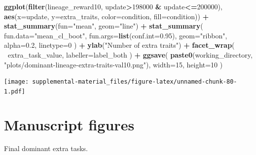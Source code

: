 \documentclass[]{book}
\newenvironment{Shaded}{\begin{snugshade}}{\end{snugshade}}
\newcommand{\DataTypeTok}[1]{\textcolor[rgb]{0.13,0.29,0.53}{#1}}
\newcommand{\DecValTok}[1]{\textcolor[rgb]{0.00,0.00,0.81}{#1}}
\newcommand{\FloatTok}[1]{\textcolor[rgb]{0.00,0.00,0.81}{#1}}
\newcommand{\KeywordTok}[1]{\textcolor[rgb]{0.13,0.29,0.53}{\textbf{#1}}}
\newcommand{\NormalTok}[1]{#1}
\newcommand{\OperatorTok}[1]{\textcolor[rgb]{0.81,0.36,0.00}{\textbf{#1}}}
\newcommand{\StringTok}[1]{\textcolor[rgb]{0.31,0.60,0.02}{#1}}
\begin{document}
\begin{Shaded}
\begin{Highlighting}[]
\KeywordTok{ggplot}\NormalTok{(}\KeywordTok{filter}\NormalTok{(lineage_reward10, update}\OperatorTok{>}\DecValTok{198000} \OperatorTok{&}\StringTok{ }\NormalTok{update}\OperatorTok{<=}\DecValTok{200000}\NormalTok{), }\KeywordTok{aes}\NormalTok{(}\DataTypeTok{x=}\NormalTok{update, }\DataTypeTok{y=}\NormalTok{extra_traits, }\DataTypeTok{color=}\NormalTok{condition, }\DataTypeTok{fill=}\NormalTok{condition)) }\OperatorTok{+}
\StringTok{  }\KeywordTok{stat_summary}\NormalTok{(}\DataTypeTok{fun=}\StringTok{"mean"}\NormalTok{, }\DataTypeTok{geom=}\StringTok{"line"}\NormalTok{) }\OperatorTok{+}
\StringTok{  }\KeywordTok{stat_summary}\NormalTok{(}
    \DataTypeTok{fun.data=}\StringTok{"mean_cl_boot"}\NormalTok{,}
    \DataTypeTok{fun.args=}\KeywordTok{list}\NormalTok{(}\DataTypeTok{conf.int=}\FloatTok{0.95}\NormalTok{),}
    \DataTypeTok{geom=}\StringTok{"ribbon"}\NormalTok{,}
    \DataTypeTok{alpha=}\FloatTok{0.2}\NormalTok{,}
    \DataTypeTok{linetype=}\DecValTok{0}
\NormalTok{  ) }\OperatorTok{+}
\StringTok{  }\KeywordTok{ylab}\NormalTok{(}\StringTok{"Number of extra traits"}\NormalTok{) }\OperatorTok{+}
\StringTok{  }\KeywordTok{facet_wrap}\NormalTok{(}
    \OperatorTok{~}\NormalTok{extra_task_value,}
    \DataTypeTok{labeller=}\NormalTok{label_both}
\NormalTok{  ) }\OperatorTok{+}
\StringTok{  }\KeywordTok{ggsave}\NormalTok{(}
    \KeywordTok{paste0}\NormalTok{(working_directory, }\StringTok{"plots/dominant-lineage-extra-traits-val10.png"}\NormalTok{),}
    \DataTypeTok{width=}\DecValTok{15}\NormalTok{,}
    \DataTypeTok{height=}\DecValTok{10}
\NormalTok{  )}
\end{Highlighting}
\end{Shaded}

\texttt{[image: supplemental-material\_files/figure-latex/unnamed-chunk-80-1.pdf]}

\hypertarget{manuscript-figures-1}{%
\section{Manuscript figures}\label{manuscript-figures-1}}

Final dominant extra tasks.
\end{document}
